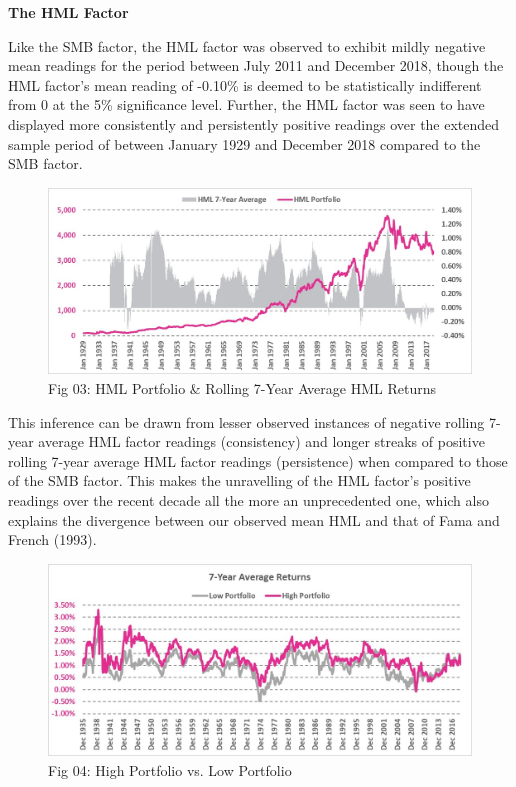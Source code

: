 \documentclass[12pt]{article}
\begin{document}
\noindent \textbf{The HML Factor}

\noindent Like the SMB factor, the HML factor was observed to exhibit mildly negative mean readings for the period between July 2011 and December 2018, though the HML factor's mean reading of -0.10\% is deemed to be statistically indifferent from 0 at the 5\% significance level. Further, the HML factor was seen to have displayed more consistently and persistently positive readings over the extended sample period of between January 1929 and December 2018 compared to the SMB factor.

\begin{figure}[h]
	\centering
	\includegraphics[width=0.9\linewidth]{HML01}
	\caption*{Fig 03: HML Portfolio \& Rolling 7-Year Average HML Returns}
	\label{fig:label}
\end{figure}

\noindent This inference can be drawn from lesser observed instances of negative rolling 7-year average HML factor readings (consistency) and longer streaks of positive rolling 7-year average HML factor readings (persistence) when compared to those of the SMB factor. This makes the unravelling of the HML factor's positive readings over the recent decade all the more an unprecedented one, which also explains the divergence between our observed mean HML and that of Fama and French (1993). 

\begin{figure}[h]
	\centering
	\includegraphics[width=0.9\linewidth]{HML02}
	\caption*{Fig 04: High Portfolio vs. Low Portfolio}
	\label{fig:label}
\end{figure}
\end{document}
